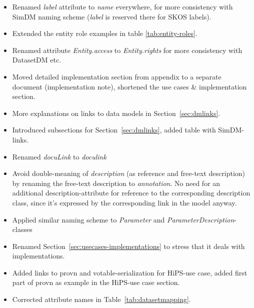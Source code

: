\documentclass[11pt,a4paper]{ivoa}
\begin{document}
\begin{itemize}
\item Renamed \emph{label} attribute to \emph{name} everywhere, for more consistency with SimDM naming scheme (\emph{label} is reserved there for SKOS labels).
\item Extended the entity role examples in table \ref{tab:entity-roles}.
\item Renamed attribute \emph{Entity.access} to \emph{Entity.rights} for more consistency with DatasetDM etc.
\item Moved detailed implementation section from appendix to a separate document (implementation note), shortened the use cases \& implementation section.
\item More explanations on links to data models in Section~\ref{sec:dmlinks}.
\item Introduced subsections for Section~\ref{sec:dmlinks}, added table with SimDM-links.
\item Renamed \emph{docuLink} to \emph{doculink}
\item Avoid double-meaning of \emph{description} (as reference and free-text description) by renaming the free-text description to \emph{annotation}. No need for an additional description-attribute for reference to the corresponding description class, since it's expressed by the corresponding link in the model anyway.
\item Applied similar naming scheme to \emph{Parameter} and \emph{ParameterDescription}-classes
\item Renamed Section~\ref{sec:usecases-implementations} to stress that it deals with implementations.
\item Added links to provn and votable-serialization for HiPS-use case, added first part of provn as example in the HiPS-use case section.
\item Corrected attribute names in Table~\ref{tab:datasetmapping}.

\end{itemize}





\end{document}
